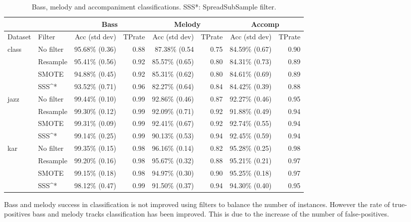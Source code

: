 \documentclass{article}
\begin{document}
\begin{table}
\scriptsize
\begin{center}
\begin{tabular}{  l | l | r | r | r | r | r | r }
\hline
 &  & \multicolumn{2}{|c|}{Bass} &  \multicolumn{2}{|c|}{Melody} & \multicolumn{2}{|c|}{Accomp}  \\
\hline
Dataset & Filter & Acc (std dev) & TPrate & Acc (std dev) & TPrate & Acc (std dev) & TPrate \\
\hline
\hline
class & No filter & 95.68\% (0.36) & 0.88 & 87.38\% (0.54 & 0.75 & 84.59\% (0.67) & 0.90 \\
 & Resample & 95.41\% (0.56) & 0.92 & 85.57\% (0.65) & 0.80 & 84.31\% (0.73) & 0.89 \\
 & SMOTE & 94.88\% (0.45) & 0.92 & 85.31\% (0.62) & 0.80 & 84.61\% (0.69) & 0.89 \\
 & SSS^* & 93.52\% (0.71) & 0.96 & 82.27\% (0.64) & 0.84 & 84.42\% (0.39) & 0.88 \\
\hline
jazz & No filter & 99.44\% (0.10) & 0.99 & 92.86\% (0.46) & 0.87 & 92.27\% (0.46) & 0.95 \\
 & Resample & 99.30\% (0.12) & 0.99 & 92.09\% (0.71) & 0.92 & 91.88\% (0.49) & 0.94 \\
 & SMOTE & 99.31\% (0.09) & 0.99 & 92.41\% (0.67) & 0.92 & 92.74\% (0.55) & 0.94 \\
 & SSS^* & 99.14\% (0.25) & 0.99 & 90.13\% (0.53) & 0.94 & 92.45\% (0.59) & 0.94 \\
\hline
kar & No filter & 99.35\% (0.15) & 0.98 & 96.16\% (0.14) & 0.82 & 95.28\% (0.25) & 0.98 \\
 & Resample & 99.20\% (0.16) & 0.98 & 95.67\% (0.32) & 0.88 & 95.21\% (0.21) & 0.97 \\
 & SMOTE & 99.15\% (0.18) & 0.98 & 94.97\% (0.30) & 0.90 & 95.25\% (0.18) & 0.97 \\
 & SSS^* & 98.12\% (0.47) & 0.99 & 91.50\% (0.37) & 0.94 & 94.30\% (0.40) & 0.95 \\
\hline
\end{tabular}
\caption{Bass, melody and accompaniment classifications. SSS*: SpreadSubSample filter.}
\label{table27}
\end{center}
\end{table}



Bass and melody success in classification is not improved using filters to balance the number of instances. However the rate of true-positives bass and melody tracks classification has been improved. This is due to the increase of the number of false-positives.
\end{document}
